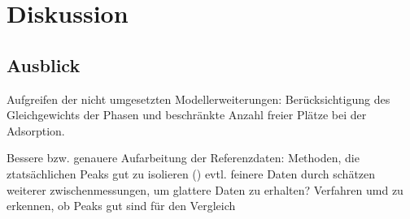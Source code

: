 \chapter{Diskussion}
\label{chapter:dis}

\section{Ausblick}
Aufgreifen der nicht umgesetzten Modellerweiterungen: Berücksichtigung des Gleichgewichts der Phasen und beschränkte Anzahl freier Plätze bei der Adsorption.

Bessere bzw. genauere Aufarbeitung der Referenzdaten: Methoden, die ztatsächlichen Peaks gut zu isolieren () evtl. feinere Daten durch schätzen weiterer zwischenmessungen, um glattere Daten zu erhalten? Verfahren umd zu erkennen, ob Peaks gut sind für den Vergleich
